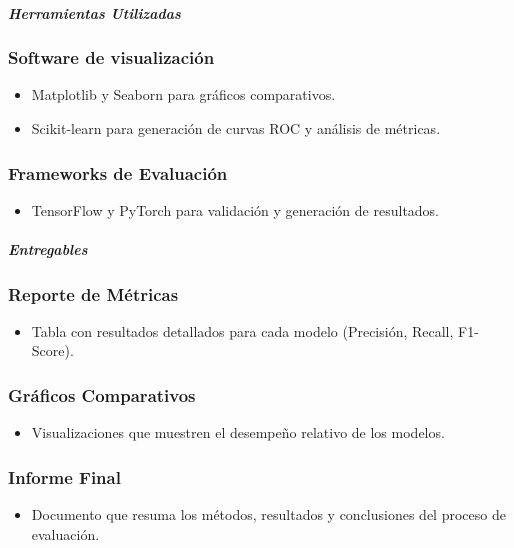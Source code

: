 \paragraph{\textit{Herramientas Utilizadas}}

\subsubsection{Software de visualización}
\begin{itemize}
    \item Matplotlib y Seaborn para gráficos comparativos.
    \item Scikit-learn para generación de curvas ROC y análisis de métricas.
\end{itemize}

\subsubsection{Frameworks de Evaluación}
\begin{itemize}
    \item TensorFlow y PyTorch para validación y generación de resultados.
\end{itemize}

\paragraph{\textit{Entregables}}

\subsubsection{Reporte de Métricas}
\begin{itemize}
    \item Tabla con resultados detallados para cada modelo (Precisión, Recall, F1-Score).
\end{itemize}


\subsubsection{Gráficos Comparativos}
\begin{itemize}
    \item Visualizaciones que muestren el desempeño relativo de los modelos.
\end{itemize}


\subsubsection{Informe Final}
\begin{itemize}
    \item Documento que resuma los métodos, resultados y conclusiones del proceso de evaluación.
\end{itemize}